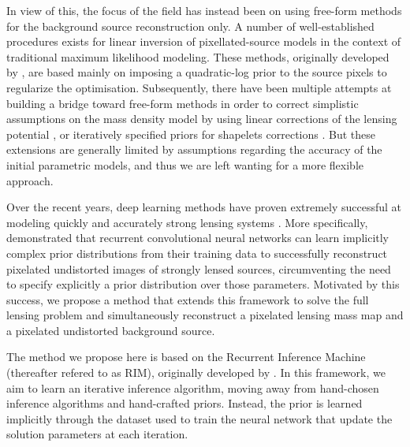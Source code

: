 In view of this, the focus of the field has instead been on using free-form methods for the background source reconstruction only. 
A number of well-established procedures exists for linear inversion of pixellated-source models  in the context of traditional maximum likelihood modeling. These methods, originally developed by \citet{Warren2003,Suyu2006}, are based mainly on imposing a quadratic-log prior to the source pixels to regularize the optimisation. Subsequently, there have been multiple attempts at building a bridge toward free-form methods in order to correct simplistic assumptions on the mass density model by using linear corrections of the lensing potential \citep{Koopmans2005,Suyu2006b,Vegetti2009,Vegetti2012}, or iteratively specified priors for shapelets corrections \citep{Birrer2018,Nightingale2018}. But these extensions are generally limited by assumptions regarding the accuracy of the initial parametric models, and thus we are left wanting for a more flexible approach. 

Over the recent years, deep learning methods have proven extremely successful at modeling quickly and accurately strong lensing systems \citep{Hezaveh2017,PerreaultLevasseur2017,Morningstar2018,Coogan2020,Park2021,Legin2021,Wagner-Carena2021,Schuldt2022,Wagner-Carena2022,Karchev2022,AnauMontel2022,Mishra-Sharma2022}.
More specifically, \citet{Morningstar2019} demonstrated that recurrent convolutional neural networks can learn implicitly complex prior distributions from their training data to successfully reconstruct pixelated undistorted images of strongly lensed sources, circumventing the need to specify explicitly a prior distribution over those parameters. Motivated by this success, we propose a method that extends this framework to solve the full lensing problem and simultaneously reconstruct a pixelated lensing mass map and a pixelated undistorted background source.

The method we propose here is based on the Recurrent Inference Machine (thereafter refered to as RIM), originally developed by \citet{Putzky2017}. 
In this framework, we aim to learn an iterative inference algorithm, moving away 
from hand-chosen inference algorithms and hand-crafted priors. 
Instead, the prior is learned implicitly through the dataset used to train 
the neural network that update the solution parameters at each iteration. 


